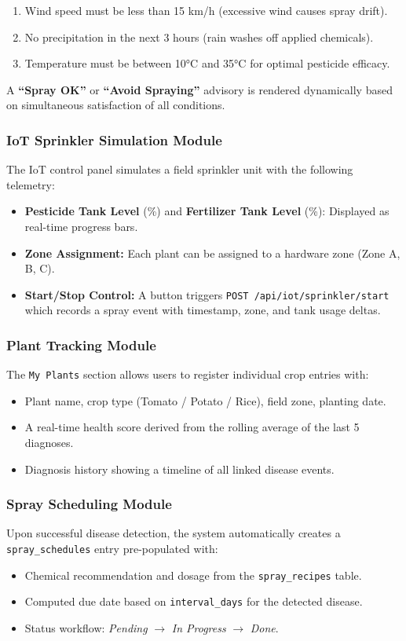 \documentclass[12pt,a4paper]{report}
\begin{document}
\begin{enumerate}
  \item Wind speed must be less than 15 km/h (excessive wind causes spray drift).
  \item No precipitation in the next 3 hours (rain washes off applied chemicals).
  \item Temperature must be between 10°C and 35°C for optimal pesticide efficacy.
\end{enumerate}

A \textbf{``Spray OK''} or \textbf{``Avoid Spraying''} advisory is rendered dynamically based on simultaneous satisfaction of all conditions.

\subsubsection{IoT Sprinkler Simulation Module}
The IoT control panel simulates a field sprinkler unit with the following telemetry:

\begin{itemize}
  \item \textbf{Pesticide Tank Level} (\%) and \textbf{Fertilizer Tank Level} (\%): Displayed as real-time progress bars.
  \item \textbf{Zone Assignment:} Each plant can be assigned to a hardware zone (Zone A, B, C).
  \item \textbf{Start/Stop Control:} A button triggers \texttt{POST /api/iot/sprinkler/start} which records a spray event with timestamp, zone, and tank usage deltas.
\end{itemize}

\subsubsection{Plant Tracking Module}
The \texttt{My Plants} section allows users to register individual crop entries with:
\begin{itemize}
  \item Plant name, crop type (Tomato / Potato / Rice), field zone, planting date.
  \item A real-time health score derived from the rolling average of the last 5 diagnoses.
  \item Diagnosis history showing a timeline of all linked disease events.
\end{itemize}

\subsubsection{Spray Scheduling Module}
Upon successful disease detection, the system automatically creates a \texttt{spray\_schedules} entry pre-populated with:
\begin{itemize}
  \item Chemical recommendation and dosage from the \texttt{spray\_recipes} table.
  \item Computed due date based on \texttt{interval\_days} for the detected disease.
  \item Status workflow: \textit{Pending} $\rightarrow$ \textit{In Progress} $\rightarrow$ \textit{Done}.
\end{itemize}
\end{document}
